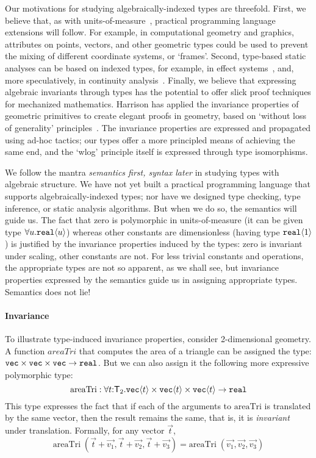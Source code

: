 Our motivations for studying algebraically-indexed types are
threefold. First, we believe that, as with
units-of-measure~\cite{fsharp}, practical programming language
extensions will follow. For example, in computational geometry and
graphics, attributes on points, vectors, and other geometric types
could be used to prevent the mixing of different coordinate systems,
or `frames'. Second, type-based static analyses can be based on
indexed types, for example, in effect systems~\cite{benton06reading},
and, more speculatively, in continuity
analysis~\cite{chaudhuri10continuity}.  Finally, we believe that
expressing algebraic invariants through types has the potential to
offer slick proof techniques for mechanized
mathematics. Harrison has applied the
invariance properties of geometric primitives to create elegant proofs
in geometry, based on `without loss of
generality' principles~\cite{harrison09without}. The invariance properties are expressed 
and propagated using ad-hoc tactics; our types offer a more principled
means of achieving the same end, and the `wlog' principle itself
is expressed through type isomorphisms.

We follow the mantra \emph{semantics first, syntax later} in studying
types with algebraic structure. We have not yet built a practical
programming language that supports algebraically-indexed types; nor
have we designed type checking, type inference, or static analysis
algorithms.  But when we do so, the semantics will guide us. The fact
that zero is polymorphic in units-of-measure (it can be given type $\forall
u.\textup{\texttt{real}}\langle u \rangle$) whereas other constants are dimensionless (having
type $\textup{\texttt{real}}\langle 1 \rangle$) is justified by the invariance properties
induced by the types: zero is invariant under scaling, other constants
are not. For less trivial constants and operations, the appropriate types are
not so apparent, as we shall see, but invariance properties expressed by
the semantics guide us in assigning appropriate types. Semantics does not lie!


\paragraph{Invariance}
To illustrate type-induced invariance properties, consider
2-dimensional geometry. 
A function $\mathit{areaTri}$ that computes the area of a triangle
can be assigned the type:
$\textup{\texttt{vec}}\times\textup{\texttt{vec}}\times\textup{\texttt{vec}}\to\texttt{real}$.
But we can also assign it the following more expressive polymorphic
type:
\[
\mathrm{areaTri} : \forall t\mathord:\mathsf{T}_2.
  \textup{\texttt{vec}}\langle t \rangle \times \textup{\texttt{vec}}\langle t \rangle \times \textup{\texttt{vec}}\langle t \rangle \to \texttt{real} \\
\]
This type expresses the fact that if each of the arguments to $\mathrm{areaTri}$
is translated by the same vector, then the result remains the same,
that is, it is \emph{invariant} under translation. Formally, for any 
vector $\vec t$,
\[
\mathrm{areaTri}\;(\vec{t} + \vec{v_1}, \vec{t} + \vec{v_2}, \vec{t} + \vec{v_3}) = 
\mathrm{areaTri}\;(\vec{v_1}, \vec{v_2}, \vec{v_3})
\]

